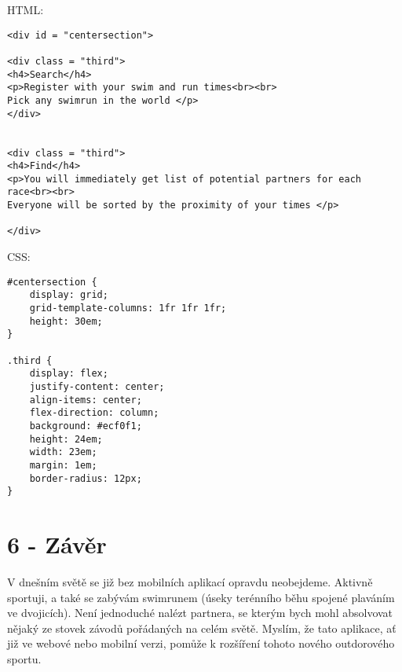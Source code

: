 \documentclass{article}
\begin{document}
HTML:
\hfill \break
\begin{verbatim}
<div id = "centersection">
    
<div class = "third">
<h4>Search</h4>
<p>Register with your swim and run times<br><br>
Pick any swimrun in the world </p>
</div>
    

<div class = "third">
<h4>Find</h4>
<p>You will immediately get list of potential partners for each race<br><br>
Everyone will be sorted by the proximity of your times </p>    

</div>
\end{verbatim}

\vspace{30 mm}
CSS: 

\begin{verbatim}
#centersection {
	display: grid;
	grid-template-columns: 1fr 1fr 1fr;
	height: 30em;
}

.third {
	display: flex;
	justify-content: center;
	align-items: center;
	flex-direction: column;
	background: #ecf0f1;
	height: 24em;
	width: 23em;
	margin: 1em;
	border-radius: 12px;
}
\end{verbatim}


\vspace{130 mm}
\section*{6 - Závěr}

V dnešním světě se již bez mobilních aplikací opravdu neobejdeme. Aktivně sportuji, a také se zabývám swimrunem (úseky terénního běhu spojené plaváním ve dvojicích). Není jednoduché nalézt partnera, se kterým bych mohl absolvovat nějaký ze stovek závodů pořádaných na celém světě. Myslím, že tato aplikace, ať již ve webové nebo mobilní verzi, pomůže k rozšíření tohoto nového outdorového sportu.
\end{document}
